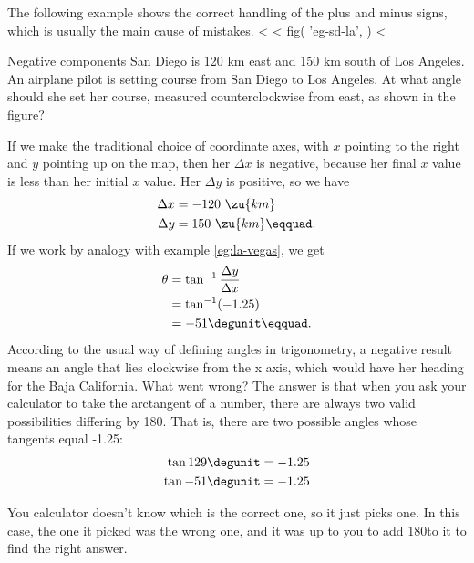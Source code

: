 The following example shows the correct handling of the plus
and minus signs, which is usually the main cause of mistakes.
<%
<%
  fig(
    'eg-sd-la',
  )
<%
\begin{eg}{Negative components}\label{eg:sd-la}
\egquestion San Diego is 120 km east and 150 km south of Los
Angeles. An airplane pilot is setting course from San Diego
to Los Angeles. At what angle should she set her course,
measured counterclockwise from east, as shown in the figure?

\eganswer If we make the traditional choice of coordinate
axes, with $x$ pointing to the right and $y$ pointing up on
the map, then her $\Delta x$ is negative, because her final
$x$ value is less than her initial $x$ value. Her $\Delta y$
is positive, so we have
\begin{align*}
        \Delta x      &=  -120\ \zu{km}  \\
        \Delta y     &=  150\ \zu{km}\eqquad.
\end{align*}
If we work by analogy with example \ref{eg:la-vegas}, we get
\begin{align*}
        \theta &= \tan^{-1}\frac{\Delta y}{\Delta x} \\
             &= \tan^{-1}(-1.25) \\
             &=  -51\degunit\eqquad.
\end{align*}
According to the usual way of defining angles in trigonometry,
a negative result means an angle that lies clockwise from
the x axis, which would have her heading for the Baja
California. What went wrong? The answer is that when you ask
your calculator to take the arctangent of a number, there
are always two valid possibilities differing by 180\degunit.
That is, there are two possible angles whose tangents equal -1.25:
\begin{align*}
        \tan  129\degunit  &=  -1.25  \\
        \tan  -51\degunit  &=  -1.25
\end{align*}

You calculator doesn't know which is the correct one, so it
just picks one. In this case, the one it picked was the
wrong one, and it was up to you to add 180\degunit to it to
find the right answer.
\end{eg}

\vfill

